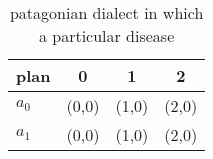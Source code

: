 \documentclass[a4paper]{article}
\begin{document}
\begin{table}
\begin{adjustbox}{width=0.6\columnwidth}
\begin{tabular}{|l|l|l|l|}
\hline
\textbf{plan} & \multicolumn{1}{c|}{\textbf{0}} & \multicolumn{1}{c|}{\textbf{1}} & \multicolumn{1}{c|}{\textbf{2}} \\ \hline
\textbf{$a_0$}  & (0,0) & (1,0) & (2,0) \\ \hline
\textbf{$a_1$}  & (0,0) & (1,0) & (2,0) \\ \hline
\end{tabular}
\end{adjustbox}
\caption{ patagonian dialect in which a particular disease
}
\end{table}
\end{document}

